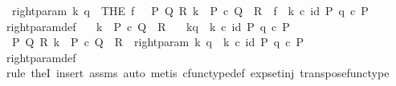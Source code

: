 \begin{isabellebody}
\ \ {\isachardoublequoteopen}right{\isacharunderscore}{\kern0pt}param\ k\ q\ {\isasymequiv}\ {\isacharparenleft}{\kern0pt}THE\ f{\isachardot}{\kern0pt}\ \ {\isasymexists}\ P\ Q\ R{\isachardot}{\kern0pt}\ k\ {\isacharcolon}{\kern0pt}\ P\ {\isasymtimes}\isactrlsub c\ Q\ {\isasymrightarrow}\ R\ {\isasymand}\ f\ {\isacharequal}{\kern0pt}\ k\ {\isasymcirc}\isactrlsub c\ {\isasymlangle}id\ P{\isacharcomma}{\kern0pt}\ q\ {\isasymcirc}\isactrlsub c\ {\isasymbeta}\isactrlbsub P\isactrlesub {\isasymrangle}{\isacharparenright}{\kern0pt}{\isachardoublequoteclose}\isanewline
\isanewline
{}\isamarkupfalse%
\ right{\isacharunderscore}{\kern0pt}param{\isacharunderscore}{\kern0pt}def{}{\isacharcolon}{\kern0pt}\isanewline
\ \ \ {\isachardoublequoteopen}k\ {\isacharcolon}{\kern0pt}\ P\ {\isasymtimes}\isactrlsub c\ Q\ {\isasymrightarrow}\ R{\isachardoublequoteclose}\isanewline
\ \ \ {\isachardoublequoteopen}k\isactrlbsub {\isacharbrackleft}{\kern0pt}{\isacharminus}{\kern0pt}{\isacharcomma}{\kern0pt}q{\isacharbrackright}{\kern0pt}\isactrlesub \ {\isasymequiv}\ k\ {\isasymcirc}\isactrlsub c\ {\isasymlangle}id\ P{\isacharcomma}{\kern0pt}\ q\ {\isasymcirc}\isactrlsub c\ {\isasymbeta}\isactrlbsub P\isactrlesub {\isasymrangle}{\isachardoublequoteclose}\isanewline
%
\isadelimproof
%
\endisadelimproof
%
\isatagproof
{}\isamarkupfalse%
\ {\isacharminus}{\kern0pt}\ \isanewline
\ \ \isamarkupfalse%
\ {\isachardoublequoteopen}{\isasymexists}\ P\ Q\ R{\isachardot}{\kern0pt}\ k\ {\isacharcolon}{\kern0pt}\ P\ {\isasymtimes}\isactrlsub c\ Q\ {\isasymrightarrow}\ R\ {\isasymand}\ right{\isacharunderscore}{\kern0pt}param\ k\ q\ {\isacharequal}{\kern0pt}\ k\ {\isasymcirc}\isactrlsub c\ {\isasymlangle}id\ P{\isacharcomma}{\kern0pt}\ q\ {\isasymcirc}\isactrlsub c\ {\isasymbeta}\isactrlbsub P\isactrlesub {\isasymrangle}{\isachardoublequoteclose}\isanewline
\ \ \ \ \isamarkupfalse%
\ right{\isacharunderscore}{\kern0pt}param{\isacharunderscore}{\kern0pt}def\ \isamarkupfalse%
\ {\isacharparenleft}{\kern0pt}rule\ theI{\isacharprime}{\kern0pt}{\isacharcomma}{\kern0pt}\ insert\ assms{\isacharcomma}{\kern0pt}\ auto{\isacharcomma}{\kern0pt}\ metis\ cfunc{\isacharunderscore}{\kern0pt}type{\isacharunderscore}{\kern0pt}def\ exp{\isacharunderscore}{\kern0pt}set{\isacharunderscore}{\kern0pt}inj\ transpose{\isacharunderscore}{\kern0pt}func{\isacharunderscore}{\kern0pt}type{\isacharparenright}{\kern0pt}\ \isanewline
\ \ \isamarkupfalse%
\ \isamarkupfalse%

\end{isabellebody}
